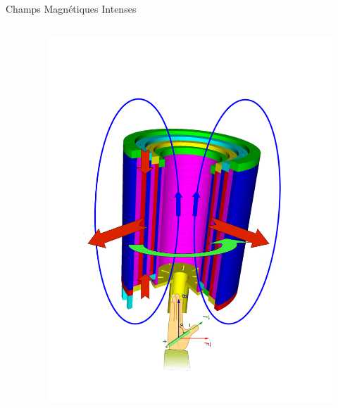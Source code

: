 \begin{frame}{Champs Magnétiques Intenses}
\begin{columns}[c]
\begin{column}{.5\linewidth}
    \end{column}
    \begin{column}{5cm}
      \vspace*{-0.3cm}
      \begin{figure}[H]
        \centering
        \includegraphics[scale=0.28]{Figures/cmi/Schema_Forces.pdf}
      \end{figure}
    \end{column}
  \end{columns}
\end{frame}

